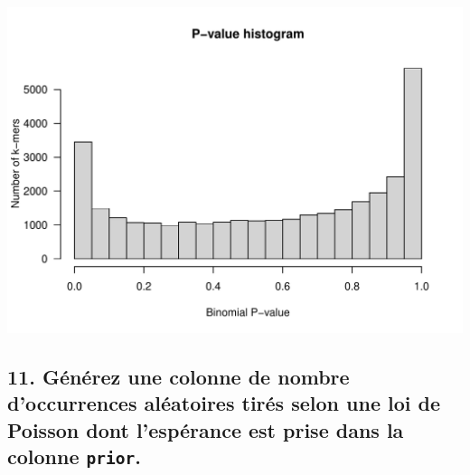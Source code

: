 \documentclass[]{article}
\newenvironment{Shaded}{\begin{snugshade}}{\end{snugshade}}
\newcommand{\KeywordTok}[1]{\textcolor[rgb]{0.94,0.87,0.69}{#1}}
\newcommand{\DataTypeTok}[1]{\textcolor[rgb]{0.87,0.87,0.75}{#1}}
\newcommand{\DecValTok}[1]{\textcolor[rgb]{0.86,0.86,0.80}{#1}}
\newcommand{\FloatTok}[1]{\textcolor[rgb]{0.75,0.75,0.82}{#1}}
\newcommand{\StringTok}[1]{\textcolor[rgb]{0.80,0.58,0.58}{#1}}
\newcommand{\OperatorTok}[1]{\textcolor[rgb]{0.94,0.94,0.82}{#1}}
\newcommand{\NormalTok}[1]{\textcolor[rgb]{0.80,0.80,0.80}{#1}}
\begin{document}
\begin{Shaded}
\end{Shaded}

\begin{center}\includegraphics{figures/multiple_tests_practical_pval_hist_kmers-1} \end{center}

\subsection{\texorpdfstring{11. Générez une colonne de nombre
d'occurrences aléatoires tirés selon une loi de Poisson dont l'espérance
est prise dans la colonne
\texttt{prior}.}{11. Générez une colonne de nombre d'occurrences aléatoires tirés selon une loi de Poisson dont l'espérance est prise dans la colonne prior.}}\label{generez-une-colonne-de-nombre-doccurrences-aleatoires-tires-selon-une-loi-de-poisson-dont-lesperance-est-prise-dans-la-colonne-prior.}
\end{document}
